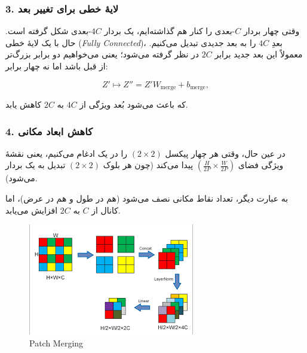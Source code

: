 \subsubsection{3. لایهٔ خطی برای تغییر بعد}
وقتی چهار بردار \(\displaystyle C\)-بعدی را کنار هم گذاشته‌ایم، یک بردار \(\displaystyle 4C\)-بعدی شکل گرفته است. 
حال با یک لایهٔ خطی (\textit{Fully Connected})، بعدِ \(\displaystyle 4C\) را به بعد جدیدی تبدیل می‌کنیم. 
معمولاً این بعد جدید برابر \(\displaystyle 2C\) در نظر گرفته می‌شود؛ 
یعنی می‌خواهیم دو برابر بزرگ‌تر از قبل باشد اما نه چهار برابر:

\[
Z' \mapsto Z'' = Z' W_{\text{merge}} + b_{\text{merge}},
\]

که باعث می‌شود بُعد ویژگی از \(\displaystyle 4C\) به \(\displaystyle 2C\) کاهش یابد.

\subsubsection{4. کاهش ابعاد مکانی}
در عین حال، وقتی هر چهار پیکسل \((2 \times 2)\) را در یک ادغام می‌کنیم، 
یعنی نقشهٔ ویژگی فضای \((\tfrac{H}{2P} \times \tfrac{W}{2P})\) پیدا می‌کند 
(چون هر بلوک \((2 \times 2)\) تبدیل به یک بردار می‌شود).

به عبارت دیگر، تعداد نقاط مکانی نصف می‌شود (هم در طول و هم در عرض)، 
اما کانال از \(\displaystyle C\) به \(\displaystyle 2C\) افزایش می‌یابد.


\begin{figure}[h]
	\centering
	\begin{minipage}[b]{1\textwidth}
		\centering
		\includegraphics[width=\textwidth]{transformer_images/patch_merging.png}
		\caption{Patch Merging}
		\label{fig:patch merging in Swin Transformer}
	\end{minipage}
	\hfill
	
\end{figure}

